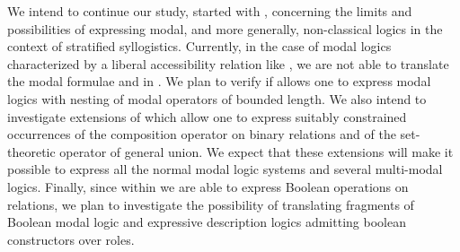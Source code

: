 \documentclass{fundam}
\begin{document}
We intend to continue our study, started with \cite{CanNic08},
concerning the limits and possibilities of expressing modal, and
more generally, non-classical logics in the context of stratified
syllogistics.  Currently, in the case of modal logics characterized by
a liberal accessibility relation like , we are not able to
translate the modal formulae  and 
in . We plan to verify if  allows one to express modal logics with nesting of modal operators of bounded length.
We also intend to investigate extensions of  which
allow one to express suitably constrained occurrences of the
composition operator on binary relations and of the set-theoretic
operator of general union. We expect that these extensions will make it possible to express
all the normal modal logic systems and several multi-modal logics.
Finally, since within  we are able to express Boolean
operations on relations, we plan to investigate the possibility of
translating fragments of Boolean modal logic and expressive description logics
admitting boolean constructors over roles.
\end{document}
